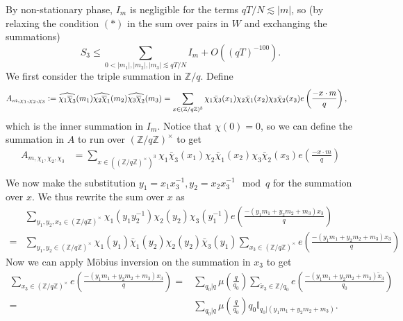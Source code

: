 By non-stationary phase, $I_m$ is negligible for the terms $qT/N\lesssim |m|$, so (by relaxing the condition $(*)$ in the sum over pairs in $W$ and exchanging the summations)
\begin{equation}
	S_3 \leq \sum_{0<|m_1|,|m_2|,|m_3|\lesssim qT/N} I_m + O((qT)^{-100}).
\end{equation}
We first consider the triple summation in $\mathbb{Z}/q$. Define \begin{align*}
	A_{m,\chi_1,\chi_2,\chi_3}&\mathrel{\mathop:}=\widehat{{\chi_1{\overline{\chi}_3}}}(m_1)\widehat{\chi_2\overline{\chi}_1}(m_2)\widehat{\chi_3\overline{\chi}_2}(m_3)= \sum_{x\in (\mathbb{Z}/q\mathbb{Z})^3}\chi_1\bar{\chi}_3(x_1)\chi_2\bar{\chi}_1(x_2)\chi_3\bar{\chi}_2(x_3) e\left(\frac{-x\cdot m}{q}\right),
\end{align*}
which is the inner summation in $I_m$.
Notice that $\chi(0)=0$, so we can define the summation in $A$ to run over $(\mathbb{Z}/q\mathbb{Z})^\times$ to get 
\begin{align*}
	A_{m,\chi_1,\chi_2,\chi_3}&= \sum_{x\in ((\mathbb{Z}/q\mathbb{Z})^\times)^3}\chi_1\bar{\chi}_3(x_1)\chi_2\bar{\chi}_1(x_2)\chi_3\bar{\chi}_2(x_3) e\left(\frac{-x\cdot m}{q}\right)\\
\end{align*}
We now make the substitution $y_1=x_1x_3^{-1}, y_2=x_2x_3^{-1} \mod q$ for the summation over $x$.
We thus rewrite the sum over $x$ as 
\begin{align*}
	&\sum_{y_1,y_2,x_3\in (\mathbb{Z}/q\mathbb{Z})^\times}
	\chi_1(y_1y_2^{-1})\chi_2(y_2)\chi_3(y_1^{-1})e\left(\frac{-(y_1m_1+y_2m_2+m_3)x_3}{q}\right)\\
	=&
	\sum_{y_1,y_2\in (\mathbb{Z}/q\mathbb{Z})^\times}\chi_1(y_1)\bar{\chi}_1(y_2)\chi_2(y_2)\bar{\chi}_3(y_1)\sum_{x_3\in (\mathbb{Z}/q\mathbb{Z})^\times}e\left(\frac{-(y_1m_1+y_2m_2+m_3)x_3}{q}\right)
\end{align*}
Now we can apply M\"obius inversion on the summation in $x_3$ to get \begin{align*}
	\sum_{x_3\in (\mathbb{Z}/q\mathbb{Z})^\times}e\left(\frac{-(y_1m_1+y_2m_2+m_3)x_3}{q}\right)=& \sum_{q_0|q} \mu\left(\frac{q}{q_0}\right)\sum_{\tilde{x}_3\in \mathbb{Z}/q_0}e\left(\frac{-(y_1m_1+y_2m_2+m_3)\tilde{x}_3}{q_0}\right) \\ =& \sum_{q_0|q} \mu\left(\frac{q}{q_0}\right) q_0 \mathbb{I}_{q_0|(y_1m_1+y_2m_2+m_3)}.
\end{align*}

